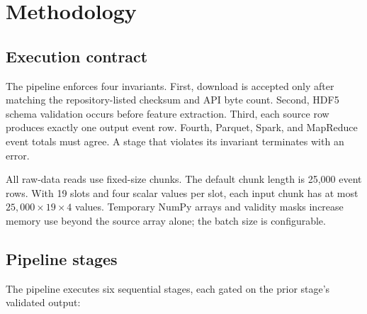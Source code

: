 \documentclass[11pt,a4paper]{article}
\begin{document}
\section{Methodology}

\subsection{Execution contract}

The pipeline enforces four invariants. First, download is accepted only after matching the repository-listed checksum and API byte count. Second, HDF5 schema validation occurs before feature extraction. Third, each source row produces exactly one output event row. Fourth, Parquet, Spark, and MapReduce event totals must agree. A stage that violates its invariant terminates with an error.

All raw-data reads use fixed-size chunks. The default chunk length is 25,000 event rows. With 19 slots and four scalar values per slot, each input chunk has at most \(25{,}000\times19\times4\) values. Temporary NumPy arrays and validity masks increase memory use beyond the source array alone; the batch size is configurable.

\subsection{Pipeline stages}

The pipeline executes six sequential stages, each gated on the prior stage's validated output:
\end{document}
